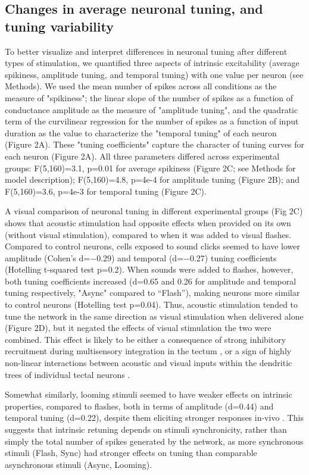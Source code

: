 \documentclass{article}
\begin{document}
\subsection*{Changes in average neuronal tuning, and tuning variability}

To better visualize and interpret differences in neuronal tuning after different types of stimulation, we quantified three aspects of intrinsic excitability (average spikiness, amplitude tuning, and temporal tuning) with one value per neuron (see Methods). We used the mean number of spikes across all conditions as the measure of "spikiness"; the linear slope of the number of spikes as a function of conductance amplitude as the measure of "amplitude tuning", and the quadratic term of the curvilinear regression for the number of spikes as a function of input duration as the value to characterize the "temporal tuning" of each neuron (Figure 2A). These "tuning coefficients" capture the character of tuning curves for each neuron (Figure 2A). All three parameters differed across experimental groups: F(5,160)=3.1, p=0.01 for average spikiness (Figure 2C; see Methods for model description); F(5,160)=4.8, p=4e-4 for amplitude tuning (Figure 2B); and F(5,160)=3.6, p=4e-3 for temporal tuning (Figure 2C).

A visual comparison of neuronal tuning in different experimental groups (Fig 2C) shows that acoustic stimulation had opposite effects when provided on its own (without visual stimulation), compared to when it was added to visual flashes. Compared to control neurons, cells exposed to sound clicks seemed to have lower amplitude (Cohen’s d=$-$0.29) and temporal (d=$-$0.27) tuning coefficients (Hotelling t-squared test p=0.2). When sounds were added to flashes, however, both tuning coefficients increased (d=0.65 and 0.26 for amplitude and temporal tuning respectively, "Async" compared to “Flash”), making neurons more similar to control neurons (Hotelling test p=0.04). Thus, acoustic stimulation tended to tune the network in the same direction as visual stimulation when delivered alone (Figure 2D), but it negated the effects of visual stimulation the two were combined. This effect is likely to be either a consequence of strong inhibitory recruitment during multisensory integration in the tectum \citep{liu2016,hamodi2016}, or a sign of highly non-linear interactions between acoustic and visual inputs within the dendritic trees of individual tectal neurons \citep{deeg2011,felch2016,truszkowski2017}. 

Somewhat similarly, looming stimuli seemed to have weaker effects on intrinsic properties, compared to flashes, both in terms of amplitude (d=0.44) and temporal tuning (d=0.22), despite them eliciting stronger responses in-vivo \citep{khakhalin2014,khakhalin2019graph}. This suggests that intrinsic retuning depends on stimuli synchronicity, rather than simply the total number of spikes generated by the network, as more synchronous stimuli (Flash, Sync) had stronger effects on tuning than comparable asynchronous stimuli (Async, Looming).
\end{document}
